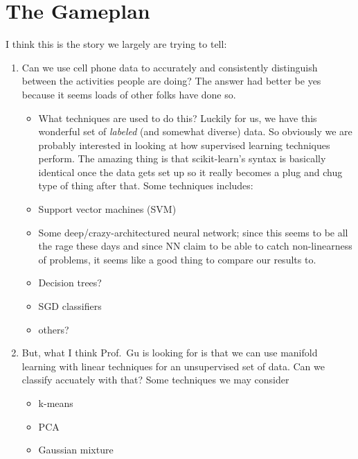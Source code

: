 \section{The Gameplan}

I think this is the story we largely are trying to tell: 
\begin{enumerate}
	\item Can we use cell phone data to accurately and consistently distinguish between the activities people are doing? The answer had better be yes because it seems loads of other folks have done so.

		\begin{itemize}
	\item What techniques are used to do this? Luckily for us, we have this wonderful set of \emph{labeled} (and somewhat diverse) data. So obviously we are probably interested in looking at how supervised learning techniques perform. The amazing thing is that scikit-learn's syntax is basically identical once the data gets set up so it really becomes a plug and chug type of thing after that. Some techniques includes:
			\item Support vector machines (SVM)
			\item Some deep/crazy-architectured neural network; since this seems to be all the rage these days and since NN claim to be able to catch non-linearness of problems, it seems like a good thing to compare our results to.
			\item  Decision trees?
			\item SGD classifiers
			\item others?
		\end{itemize}

	\item But, what I think Prof.\ Gu is looking for is that we can use manifold learning with linear techniques for an unsupervised set of data. Can we classify accuately with that? Some techniques we may consider
		\begin{itemize}
			\item k-means
			\item PCA
			\item Gaussian mixture
		\end{itemize}

\end{enumerate}
